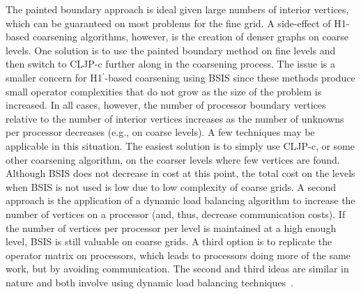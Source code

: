 \documentclass{elsart}
\begin{document}
The painted boundary approach is ideal given large numbers of interior
vertices, which can be guaranteed on most problems for the fine grid.
A side-effect of H1-based coarsening algorithms, however, is the
creation of denser graphs on coarse levels. One solution is to use the
painted boundary method on fine levels and then switch to CLJP-c
further along in the coarsening process. The issue is a smaller
concern for H1$^\prime$-based coarsening using BSIS since these
methods produce small operator complexities that do not grow as the
size of the problem is increased. In all cases, however, the number of
processor boundary vertices relative to the number of interior
vertices increases as the number of unknowns per processor decreases
(e.g., on coarse levels). A few techniques may be applicable in this
situation. The easiest solution is to simply use CLJP-c, or some other
coarsening algorithm, on the coarser levels where few vertices are
found. Although BSIS does not decrease in cost at this point, the
total cost on the levels when BSIS is not used is low due to low
complexity of coarse grids. A second approach is the application of a
dynamic load balancing algorithm to increase the number of vertices on
a processor (and, thus, decrease communication costs). If the number
of vertices per processor per level is maintained at a high enough
level, BSIS is still valuable on coarse grids. A third option is to
replicate the operator matrix on processors, which leads to processors
doing more of the same work, but by avoiding communication. The second
and third ideas are similar in nature and both involve using dynamic
load balancing techniques~\cite{DevineBomanKarypisPP04, CybDLB,
deCoughnyLB, SchloegelLB, ZoltanParHyp06ipdps, ZoltanParHypRepart07}.



\end{document}
